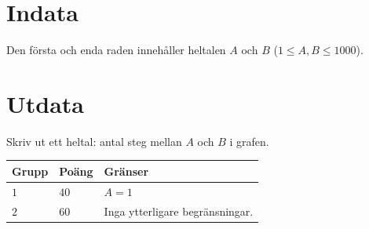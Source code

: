 \section*{Indata}
Den första och enda raden innehåller heltalen $A$ och $B$ ($1\leq A,B \leq 1000$).

\section*{Utdata}
Skriv ut ett heltal: antal steg mellan $A$ och $B$ i grafen.

\noindent
\begin{tabular}{| l | l | p{12cm} |}
  \hline
  \textbf{Grupp} & \textbf{Poäng} & \textbf{Gränser} \\ \hline
  $1$    & $40$       & $A=1$ \\ \hline
  $2$    & $60$       & Inga ytterligare begränsningar. \\ \hline
\end{tabular}


